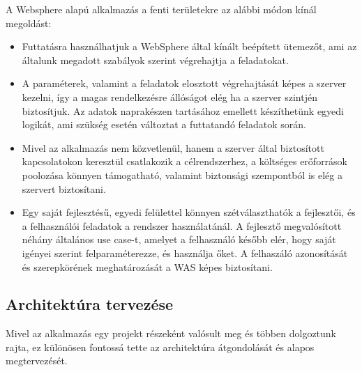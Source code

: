 
A Websphere alapú alkalmazás a fenti területekre az alábbi módon kínál megoldást:
\begin{itemize}
	\item Futtatásra használhatjuk a WebSphere által kínált beépített ütemezőt, ami az általunk megadott szabályok szerint végrehajtja a feladatokat.
	
	\item A paraméterek, valamint a feladatok elosztott végrehajtását képes a szerver kezelni, így a magas rendelkezésre állóságot elég ha a szerver szintjén biztosítjuk. Az adatok naprakészen tartásához emellett készíthetünk egyedi logikát, ami szükség esetén változtat a futtatandó feladatok során.
	
	\item Mivel az alkalmazás nem közvetlenül, hanem a szerver által biztosított kapcsolatokon keresztül csatlakozik a célrendszerhez, a költséges erőforrások poolozása könnyen támogatható, valamint biztonsági szempontból is elég a szervert biztosítani.
	
	\item Egy saját fejlesztésű, egyedi felülettel könnyen szétválaszthatók a fejlesztői, és a felhasználói feladatok a rendszer használatánál. A fejlesztő megvalósított néhány általános use case-t, amelyet a felhasználó később elér, hogy saját igényei szerint felparaméterezze, és használja őket. A felhaszáló azonosítását és szerepkörének meghatározását a WAS képes biztosítani.
	
\end{itemize}

\subsection{Architektúra tervezése}

Mivel az alkalmazás egy projekt részeként valósult meg és többen dolgoztunk rajta, ez különösen fontossá tette az architektúra átgondolását és alapos megtervezését. 


